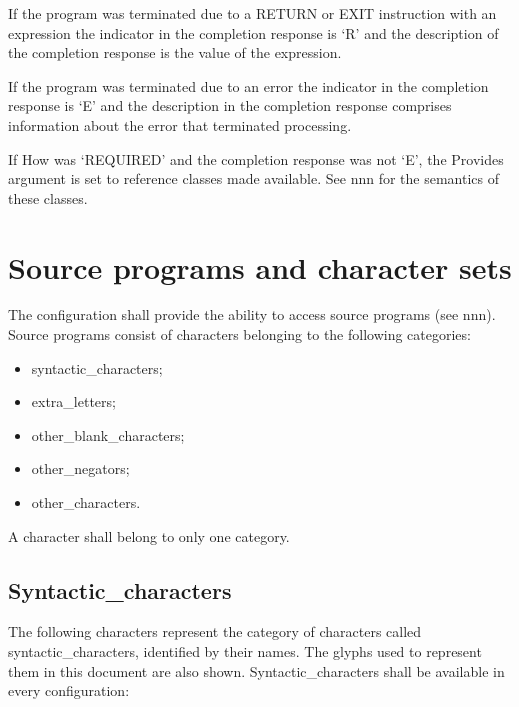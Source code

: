 If the program was terminated due to a RETURN or EXIT instruction with
an expression the indicator in the completion response is `R' and the
description of the completion response is the value of the expression.

If the program was terminated due to an error the indicator in the
completion response is `E' and the description in the completion
response comprises information about the error that terminated
processing.

If How was `REQUIRED' and the completion response was not `E', the
Provides argument is set to reference classes made available. See nnn
for the semantics of these classes.

\hypertarget{source-programs-and-character-sets}{%
\section{Source programs and character
sets}\label{source-programs-and-character-sets}}

The configuration shall provide the ability to access source programs
(see nnn). Source programs consist of characters belonging to the
following categories:

\begin{itemize}
\item
  syntactic\_characters;
\item
  extra\_letters;
\item
  other\_blank\_characters;
\item
  other\_negators;
\item
  other\_characters.
\end{itemize}

A character shall belong to only one category.

\hypertarget{syntactic_characters}{%
\subsection{Syntactic\_characters}\label{syntactic_characters}}

The following characters represent the category of characters called
syntactic\_characters, identified by their names. The glyphs used to
represent them in this document are also shown. Syntactic\_characters
shall be available in every configuration:

